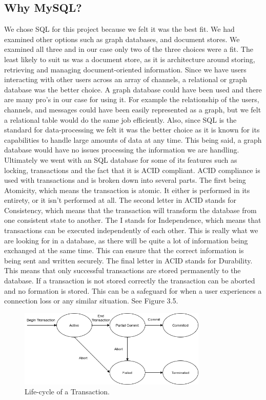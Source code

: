 \subsection{Why MySQL?}
We chose SQL for this project because we felt it was the best fit. We had examined other options such as graph databases, and document stores. We examined all three and in our case only two of the three choices were a fit. The least likely to suit us was a document store, as it is architecture around storing, retrieving and managing document-oriented information. Since we have users interacting with other users across an array of channels, a relational or graph database was the better choice.  A graph database could have been used and there are many pro’s in our case for using it. For example the relationship of the users, channels, and messages could have been easily represented as a graph, but we felt a relational table would do the same job efficiently. Also, since SQL is the standard for data-processing we felt it was the better choice as it is known for its capabilities to handle large amounts of data at any time. This being said, a graph database would have no issues processing the information we are handling. Ultimately we went with an SQL database for some of its features such as locking, transactions and the fact that it is ACID compliant. ACID compliance is used with transactions and is broken down into several parts. The first being Atomicity, which means the transaction is atomic. It either is performed in its entirety, or it isn’t performed at all. The second letter in ACID stands for Consistency, which means that the transaction will transform the database from one consistent state to another. The I stands for Independence, which means that transactions can be executed independently of each other. This is really what we are looking for in a database, as there will be quite a lot of information being exchanged at the same time. This can ensure that the correct information is being sent and written securely. The final letter in ACID stands for Durability. This means that only successful transactions are stored permanently to the database. If a transaction is not stored correctly the transaction can be aborted and no formation is stored. This can be a safeguard for when a user experiences a connection loss or any similar situation.  See Figure 3.5.

\begin{figure}[h!]
    \caption{Life-cycle of a Transaction.}
    \label{image:txLifeCycle}
    \centering
    \includegraphics[width=0.8\textwidth]{images/TransactionLifeCycle_ACID.png}
\end{figure}